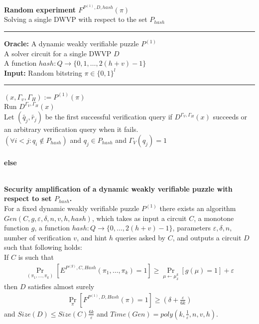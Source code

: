 \begin{codeblock}
  \textbf{Random experiment $F^{P^{(1)}, D, hash}(\pi)$} \\
  Solving a single DWVP with respect to the set $P_{hash}$
  \medskip

  \hrule

  \medskip

  \textbf{Oracle:}
  A dynamic weakly verifiable puzzle $P^{(1)}$ \\
  \IndI A solver circuit for a single DWVP $D$ \\
  \IndI A function $hash: Q \rightarrow \{0,1,\dots, 2(h+v)-1\}$ \\
  \textbf{Input:} Random bitstring $\pi \in \{0,1\}^l$
  \medskip\hrule\medskip

  $(x, \Gamma_v, \Gamma_H) := P^{(1)}(\pi)$ \\
  Run $D^{\Gamma_V, \Gamma_H}(x)$ \\
  \IndI Let $(\widetilde{q_j},\widetilde{r_j})$ be the first successful verification query if $D^{\Gamma_V, \Gamma_H}(x)$ succeeds or \\
  \IndI an arbitrary verification query when it fails. \\
  \If $(\forall i < j :  q_i \notin  P_{hash} )$ and $q_j \in P_{hash}$ and $\Gamma_V(q_j) = 1$ \then \\
  \IndI {} \\
  \textbf{else}\\
  \IndI {}\\

\end{codeblock}
%
%
\begin{lemma}
  \label{lemma:sec_amp_for_p_hash}
  \textbf{Security amplification of a dynamic weakly verifiable puzzle with respect to set $P_{hash}$.} \\
  For a fixed dynamic weakly verifiable puzzle $P^{(1)}$ there exists an algorithm\\
  $Gen(C, g, \varepsilon, \delta, n, v, h, hash)$, which takes as input a circuit $C$, a monotone function $g$,
  a function $hash : Q \rightarrow \{0, \dots, 2(h+v)-1\}$, parameters $\varepsilon, \delta, n$,
  number of verification $v$, and hint $h$ queries asked by $C$, and outputs a circuit $D$
  such that following holds: \\
  If $C$ is such that \\
  \begin{align*}
    \underset{(\pi_1, \dots, \pi_k)}{\Pr}[E^{P^{(g)}, C, Hash}(\pi_1, \dots, \pi_k)=1] \geq \underset{\mu \leftarrow \mu_\delta^k}{\Pr}[g(\mu) = 1] + \varepsilon
  \end{align*}
  then $D$ satisfies almost surely
  \begin{align*}
    \underset{\pi}{\Pr}[F^{P^{(1)},D, Hash}(\pi) = 1] \geq (\delta + \frac{\varepsilon}{6k})
  \end{align*}
  and $Size(D) \leq Size(C)\frac{6k}{\varepsilon}$ and $Time(Gen) = poly(k, \frac{1}{\varepsilon}, n, v, h)$.
\end{lemma}

